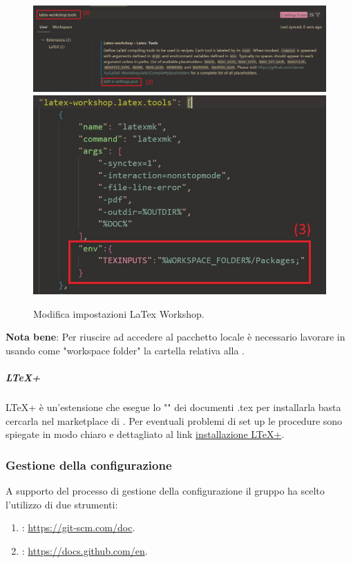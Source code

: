 \begin{figure}[H]
    \center
    \includegraphics[scale=0.4]{Sezioni/ProcessiDiSupporto/Immagini/texinputs_setup.png}
    \includegraphics[]{Sezioni/ProcessiDiSupporto/Immagini/texinputs_setup_json.jpg}
    \caption{Modifica impostazioni LaTex Workshop.}
    \label{fig:texinputs}
\end{figure}
\textbf{Nota bene}: Per riuscire ad accedere al pacchetto locale è necessario lavorare in  usando come "workspace folder" la cartella relativa alla .

\subparagraph{LTeX+}
LTeX+ è un'estensione che esegue lo "" dei documenti .tex per installarla basta cercarla nel marketplace di .
Per eventuali problemi di set up le procedure sono spiegate in modo chiaro e dettagliato al link \href{https://ltex-plus.github.io/ltex-plus/vscode-ltex-plus/setting-scopes-files.html}{installazione LTeX+}.

\subsubsection{Gestione della configurazione}
A supporto del processo di gestione della configurazione il gruppo ha scelto l'utilizzo di due strumenti:
\begin{enumerate}
    \item {}: \href{https://git-scm.com/doc}{https://git-scm.com/doc}.
    \item {}: \href{https://docs.github.com/en}{https://docs.github.com/en}.
\end{enumerate}

